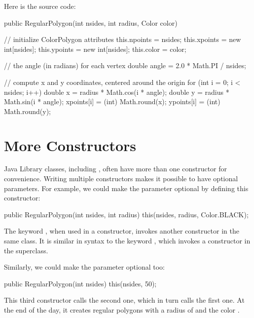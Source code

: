 Here is the source code:

\begin{code}
public RegularPolygon(int nsides, int radius, Color color) {

    // initialize ColorPolygon attributes
    this.npoints = nsides;
    this.xpoints = new int[nsides];
    this.ypoints = new int[nsides];
    this.color = color;

    // the angle (in radians) for each vertex
    double angle = 2.0 * Math.PI / nsides;

    // compute x and y coordinates, centered around the origin
    for (int i = 0; i < nsides; i++) {
        double x = radius * Math.cos(i * angle);
        double y = radius * Math.sin(i * angle);
        xpoints[i] = (int) Math.round(x);
        ypoints[i] = (int) Math.round(y);
    }
}
\end{code}



\section{More Constructors}

Java Library classes, including , often have more than one constructor for convenience.
Writing multiple constructors makes it possible to have optional parameters.
For example, we could make the  parameter optional by defining this constructor:

\begin{code}
public RegularPolygon(int nsides, int radius) {
    this(nsides, radius, Color.BLACK);
}
\end{code}

The keyword , when used in a constructor, invokes another constructor in the same class.
It is similar in syntax to the keyword , which invokes a constructor in the superclass.

Similarly, we could make the  parameter optional too:

\begin{code}
public RegularPolygon(int nsides) {
    this(nsides, 50);
}
\end{code}

This third constructor calls the second one, which in turn calls the first one.
At the end of the day, it creates regular polygons with a radius of  and the color .

